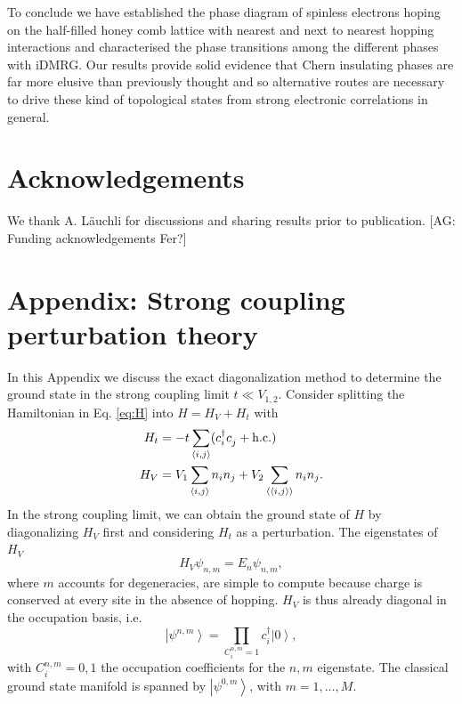 \documentclass[aps,prx,10pt,twocolumn,floatfix,superscriptaddress,showpacs,numerical,footinbib]{revtex4-1}
\newcommand{\noteAG}[1]{{\color{blue} [AG: #1]}}
\begin{document}
To conclude we have established the phase diagram of spinless electrons hoping on the half-filled honey comb lattice
with nearest and next to nearest hopping interactions and characterised the phase transitions among the different phases with iDMRG.
%
Our results provide solid evidence that Chern insulating phases are far more elusive than previously thought and
so alternative routes are necessary to drive these kind of topological states from strong electronic correlations in general.
%
\section{Acknowledgements}

We thank A. L\"auchli for discussions and sharing results prior to publication.
\noteAG{Funding acknowledgements Fer?}

\section{\label{sec:appendix} Appendix: Strong coupling perturbation theory}

In this Appendix we discuss the exact diagonalization method to determine the ground state in the strong coupling limit $t \ll V_{1,2}$. 
%
Consider splitting the Hamiltonian in Eq. \eqref{eq:H} into $H =H_V + H_t$ with
\begin{align}
%
 H_t &=-t\sum_{\left\langle i,j\right\rangle}(c^{\dagger}_{i}c^{\vphantom{\dagger}}_{j}+ \mathrm{h.c.}) \\
H_V &= V_{1}\sum_{\left\langle i,j\right\rangle }n_{i}n_{j}+
%
V_{2}\sum_{\left\langle \left\langle i,j\right\rangle \right\rangle }n_{i}n_{j}. 
%
\label{eq:Hsplit}
\end{align}
%
In the strong coupling limit, we can obtain the ground state of $H$ by diagonalizing $H_V$ first and considering $H_t$ as a perturbation. 
%
The eigenstates of $H_V$
\begin{equation}
H_V \psi_{n,m} = E_n \psi_{n,m},
\end{equation}
where $m$ accounts for degeneracies, are simple to compute because charge is conserved at every site in the absence of hopping. 
%
$H_V$ is thus already diagonal in the occupation basis, i.e.
\begin{equation}
\left| \psi^{n,m}\right> = \prod_{C^{n,m}_i = 1} c^\dagger_i \left|0\right>,
\end{equation}
%
 with $C^{n,m}_i=0,1$ the occupation coefficients for the $n,m$ eigenstate. 
The classical ground state manifold is spanned by $\left|\psi^{0,m}\right>$, with $m=1,\dots,M$.   
\end{document}

